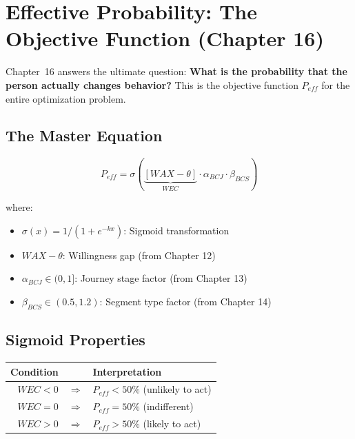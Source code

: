 \section{Effective Probability: The Objective Function (Chapter 16)}
\label{sec:mp-peff}

Chapter~16 answers the ultimate question: \textbf{What is the probability that the person actually changes behavior?} This is the objective function $P_{eff}$ for the entire optimization problem.

\subsection{The Master Equation}

\begin{equation}
\boxed{
P_{eff} = \sigma\left( \underbrace{[WAX - \theta]}_{WEC} \cdot \alpha_{BCJ} \cdot \beta_{BCS} \right)
}
\label{eq:mp-peff-master}
\end{equation}

where:
\begin{itemize}[nosep]
\item $\sigma(x) = 1/(1 + e^{-kx})$: Sigmoid transformation
\item $WAX - \theta$: Willingness gap (from Chapter 12)
\item $\alpha_{BCJ} \in (0,1]$: Journey stage factor (from Chapter 13)
\item $\beta_{BCS} \in (0.5, 1.2)$: Segment type factor (from Chapter 14)
\end{itemize}

\subsection{Sigmoid Properties}

\begin{center}
\renewcommand{\arraystretch}{1.2}
\begin{tabular}{@{}rcl@{}}
\toprule
\textbf{Condition} & & \textbf{Interpretation} \\
\midrule
$WEC < 0$ & $\Rightarrow$ & $P_{eff} < 50\%$ (unlikely to act) \\
$WEC = 0$ & $\Rightarrow$ & $P_{eff} = 50\%$ (indifferent) \\
$WEC > 0$ & $\Rightarrow$ & $P_{eff} > 50\%$ (likely to act) \\
\bottomrule
\end{tabular}
\end{center}

